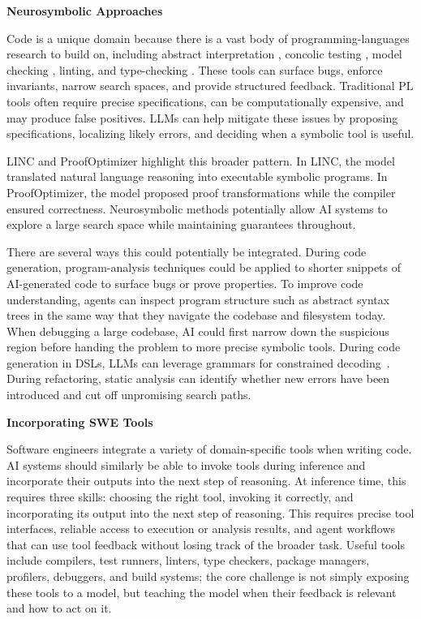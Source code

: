 \par\medskip\noindent\textbf{Neurosymbolic Approaches}\label{d:sec-neurosymbolic}\par\smallskip

Code is a unique domain because there is a vast body of programming-languages research to build on, including abstract interpretation \citep{cousot1977abstract}, concolic testing \citep{godefroid2005dart, sen2005cute}, model checking \citep{clarke1997model}, linting, and type-checking \citep{cardelli1996type}. These tools can surface bugs, enforce invariants, narrow search spaces, and provide structured feedback. Traditional PL tools often require precise specifications, can be computationally expensive, and may produce false positives. LLMs can help mitigate these issues by proposing specifications, localizing likely errors, and deciding when a symbolic tool is useful.

LINC and ProofOptimizer highlight this broader pattern. In LINC, the model
translated natural language reasoning into executable symbolic programs. In ProofOptimizer,
the model proposed proof transformations while the compiler ensured correctness.
Neurosymbolic methods potentially allow AI systems to explore a large search space while maintaining guarantees throughout.

There are several ways this could potentially be integrated. During code generation, 
program-analysis techniques could be applied to shorter snippets of AI-generated code to 
surface bugs or prove properties. To improve code understanding, agents can inspect program 
structure such as abstract syntax trees \citep{gong2024ast} in the same way that they navigate
the codebase and filesystem today. 
When debugging a large codebase, AI could first narrow down the suspicious region before handing 
the problem to more precise symbolic tools. During code generation in DSLs, LLMs can leverage grammars 
for constrained decoding~\citep{poesia2022synchromesh, geng2023grammar, wei2023copiloting}. During refactoring, 
static analysis can identify whether new errors have been introduced and cut off unpromising 
search paths.

\par\medskip\noindent\textbf{Incorporating SWE Tools}\label{d:sec-agents-tools}\par\smallskip

Software engineers integrate a variety of domain-specific tools when writing code. AI systems should similarly be able to invoke tools during inference and incorporate their outputs into the next step of reasoning. At inference time, this requires three skills: choosing the right tool, invoking it correctly, and incorporating its output into the next step of reasoning. This requires precise tool interfaces, reliable access to execution or analysis results, and agent workflows that can use tool feedback without losing track of the broader task. Useful tools include compilers, test runners, linters, type checkers, package managers, profilers, debuggers, and build systems; the core challenge is not simply exposing these tools to a model, but teaching the model when their feedback is relevant and how to act on it.

